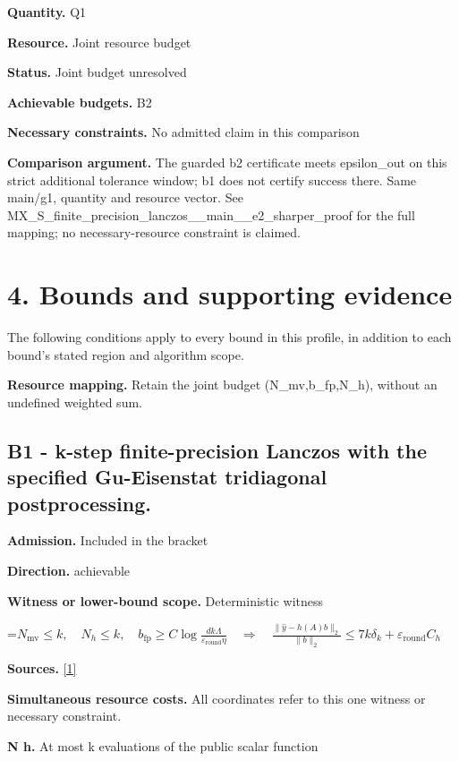 \documentclass[10pt,a4paper]{article}
\newcommand{\AtlasMath}[1]{\par\begingroup\centering\setbox0=\hbox{$\displaystyle #1$}\ifdim\wd0>1.4\linewidth\typeout{ATLAS WIDE FORMULA: \the\wd0}\fi\ifdim\wd0>\linewidth\resizebox{\linewidth}{!}{\box0}\else\box0\fi\par\endgroup}
\begin{document}
\textbf{Quantity.} Q1

\textbf{Resource.} Joint resource budget

\textbf{Status.} Joint budget unresolved

\textbf{Achievable budgets.} B2

\textbf{Necessary constraints.} No admitted claim in this comparison

\textbf{Comparison argument.} The guarded b2 certificate meets epsilon\_\allowbreak{}out on this strict additional tolerance window; b1 does not certify success there. Same main/g1, quantity and resource vector. See MX\_\allowbreak{}S\_\allowbreak{}finite\_\allowbreak{}precision\_\allowbreak{}lanczos\_\allowbreak{}\_\allowbreak{}main\_\allowbreak{}\_\allowbreak{}e2\_\allowbreak{}sharper\_\allowbreak{}proof for the full mapping; no necessary-resource constraint is claimed.

\section{4. Bounds and supporting evidence}
The following conditions apply to every bound in this profile, in addition to each bound's stated region and algorithm scope.

\textbf{Resource mapping.} Retain the joint budget (N\_\allowbreak{}mv,b\_\allowbreak{}fp,N\_\allowbreak{}h), without an undefined weighted sum.

\subsection{B1 - k-step finite-precision Lanczos with the specified Gu-Eisenstat tridiagonal postprocessing.}
\textbf{Admission.} Included in the bracket

\textbf{Direction.} achievable

\textbf{Witness or lower-bound scope.} Deterministic witness

\AtlasMath{N_{\mathrm{mv}}\le k,\quad N_h\le k,\quad b_{\mathrm{fp}}\ge C\log\frac{dk\Lambda}{\varepsilon_{\mathrm{round}}\eta}\quad\Longrightarrow\quad \frac{\|\widehat y-h(A)b\|_2}{\|b\|_2}\le7k\delta_k+\varepsilon_{\mathrm{round}}C_h}
\textbf{Sources.} \href{https://arxiv.org/pdf/1708.07788v2}{[1]}

\textbf{Simultaneous resource costs.} All coordinates refer to this one witness or necessary constraint.

\textbf{N h.} At most k evaluations of the public scalar function
\end{document}
